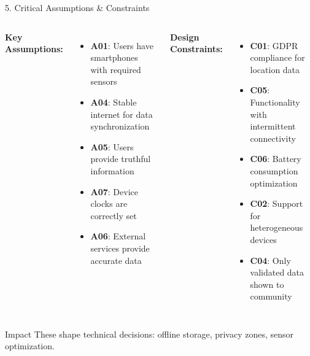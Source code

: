 \documentclass[aspectratio=169, 10pt]{beamer}
\begin{document}
\begin{frame}{5. Critical Assumptions \& Constraints}
    \begin{columns}[T]
        \textbf{Key Assumptions:}
        \begin{itemize}
            \item \textbf{A01}: Users have smartphones with required sensors
            \item \textbf{A04}: Stable internet for data synchronization
            \item \textbf{A05}: Users provide truthful information
            \item \textbf{A07}: Device clocks are correctly set
            \item \textbf{A06}: External services provide accurate data
        \end{itemize}
        
        \textbf{Design Constraints:}
        \begin{itemize}
            \item \textbf{C01}: GDPR compliance for location data
            \item \textbf{C05}: Functionality with intermittent connectivity
            \item \textbf{C06}: Battery consumption optimization
            \item \textbf{C02}: Support for heterogeneous devices
            \item \textbf{C04}: Only validated data shown to community
        \end{itemize}
    \end{columns}
    
    \vspace{0.3cm}
    \begin{alertblock}{Impact}
        These shape technical decisions: offline storage, privacy zones, sensor optimization.
    \end{alertblock}
\end{frame}
\end{document}
